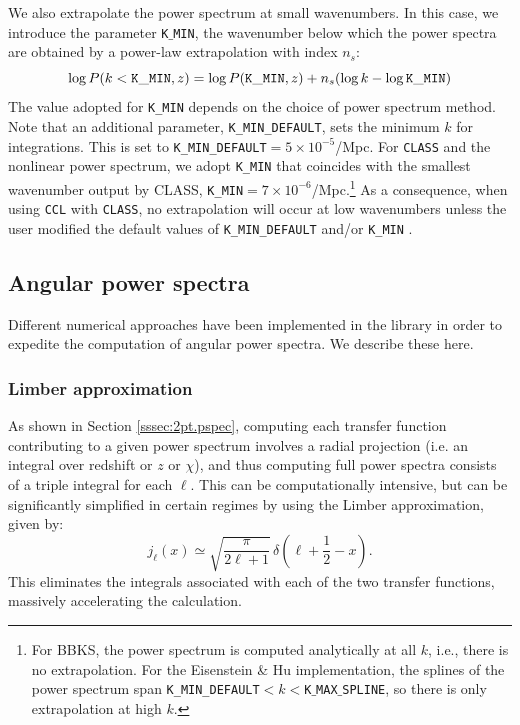 \documentclass[\docopts]{\docclass}
\begin{document}
We also extrapolate the power spectrum at small wavenumbers. In this case, we introduce the parameter {\tt K$\_$MIN}, the wavenumber below which the power spectra are obtained by a power-law extrapolation with index $n_s$:
\begin{equation}
  \log P(k<{\tt K\_MIN},z) = \log P({\tt K\_MIN},z) + n_s (\log k-\log{\tt K\_MIN})
\end{equation}
The value adopted for {\tt K\_MIN} depends on the choice of power spectrum method. Note that an additional parameter, {\tt K\_MIN\_DEFAULT}, sets the minimum $k$ for integrations. This is set to {\tt K\_MIN\_DEFAULT}$=5\times 10^{-5}$/Mpc. For {\tt CLASS} and the nonlinear power spectrum, we adopt {\tt K\_MIN} that coincides with the smallest wavenumber output by CLASS, {\tt K\_MIN}$=7\times 10^{-6}$/Mpc.\footnote{For BBKS, the power spectrum is computed analytically at all $k$, i.e., there is no extrapolation. For the Eisenstein \& Hu implementation, the splines of the power spectrum span {\tt K\_MIN\_DEFAULT}$<k<${\tt K$\_$MAX$\_$SPLINE}, so there is only extrapolation at high $k$.} As a consequence, when using {\tt CCL} with {\tt CLASS}, no extrapolation will occur at low wavenumbers unless the user modified the default values of {\tt K\_MIN\_DEFAULT} and/or {\tt K\_MIN} .

\subsection{Angular power spectra}

Different numerical approaches have been implemented in the library in order to expedite the computation of angular power spectra. We describe these here.

\subsubsection{Limber approximation}

As shown in Section \ref{sssec:2pt.pspec}, computing each transfer function contributing to a given power spectrum involves a radial projection (i.e. an integral over redshift or $z$ or $\chi$), and thus computing full power spectra consists of a triple integral for each $\ell$. This can be computationally intensive, but can be significantly simplified in certain regimes by using the Limber approximation, given by:
\begin{equation}
 j_\ell(x)\simeq\sqrt{\frac{\pi}{2\ell+1}}\,\delta\left(\ell+\frac{1}{2}-x\right).
\end{equation}
This eliminates the integrals associated with each of the two transfer functions, massively accelerating the calculation.
\end{document}
